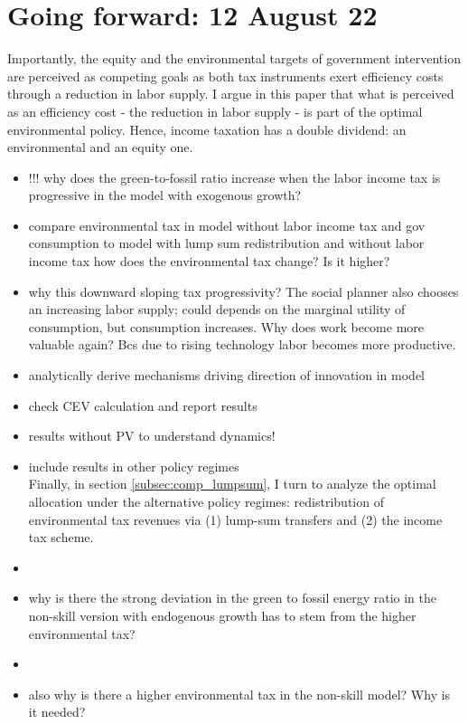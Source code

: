 
\section{Going forward: 12 August 22}

Importantly, the equity and the environmental targets of government intervention are perceived as competing goals as both tax instruments exert efficiency costs through a reduction in labor supply.
I argue in this paper that what is perceived as an efficiency cost -  the reduction in labor supply - is part of the optimal environmental policy. Hence, income taxation has a double dividend: an environmental and an equity one.   




\begin{itemize}
	\item !!! why does the green-to-fossil ratio increase when the labor income tax is progressive in the model with exogenous growth?
	\item compare environmental tax in model without labor income tax and gov consumption to model with lump sum redistribution and without labor income tax \ar how does the environmental tax change? Is it higher?
	\item why this downward sloping tax progressivity? The social planner also chooses an increasing labor supply; could depends on the marginal utility of consumption, but consumption increases. Why does work become more valuable again? 
	Bcs due to rising technology labor becomes more productive. 
	\item analytically derive mechanisms driving direction of innovation in model
	\item check CEV calculation and report results
	\item results without PV to understand dynamics!
	\item include results in other policy regimes\\
	Finally, in section \ref{subsec:comp_lumpsum}, I turn to analyze the optimal allocation under the alternative policy regimes: redistribution of environmental tax revenues via (1) lump-sum transfers and (2) the income tax scheme. 
	\item {}
	\item why is there the strong deviation in the green to fossil energy ratio in the non-skill version with endogenous growth \ar has to stem from the higher environmental tax? \checkmark 
	\item {}
	\item also why is there a higher environmental tax in the non-skill model? Why is it needed? \checkmark
\end{itemize}

